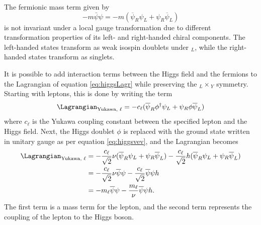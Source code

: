 The fermionic mass term given by 
\begin{equation}
    -m\bar{\psi}\psi=-m(\overline{\psi}_R\psi_L+\psi_R\overline{\psi}_L)
\end{equation}
is not invariant under a local gauge transformation due to different transformation properties of its left- and right-handed chiral components. The left-handed states transform as weak isospin doublets under $_L$, while the right-handed states transform as singlets. 

It is possible to add interaction terms between the Higgs field and the fermions to the Lagrangian of equation \ref{eq:higgsLagr} while preserving the $_L\times$$_Y$ symmetry. Starting with leptons, this is done by writing the term
\begin{equation}
    \Lagrangian_{\text{Yukawa, }\ell}=-c_{\ell} (\overline{\psi}_R\phi^{\dagger}\psi_L+\psi_R\phi\overline{\psi}_L)
\end{equation}
where $c_{\ell}$ is the Yukawa coupling constant between the specified lepton and the Higgs field. Next, the Higgs doublet $\phi$ is replaced with the ground state written in unitary gauge as per equation \ref{eq:higgsvev}, and the Lagrangian becomes
\begin{align}
    \Lagrangian_{\text{Yukawa, }\ell} & = -\dfrac{c_{\ell}}{\sqrt{2}}\nu(\overline{\psi}_R\psi_L+\psi_R\overline{\psi}_L) - \dfrac{c_{\ell}}{\sqrt{2}}h(\overline{\psi}_R\psi_L+\psi_R\overline{\psi}_L)\\
             & = -\dfrac{c_{\ell}}{\sqrt{2}}\nu\overline{\psi}\psi - \dfrac{c_{\ell}}{\sqrt{2}}\overline{\psi}\psi h \\
             & = -m_{\ell}\overline{\psi}\psi - \dfrac{m_{\ell}}{\nu}\overline{\psi}\psi h.
\end{align}
The first term is a mass term for the lepton, and the second term represents the coupling of the lepton to the Higgs boson. 

